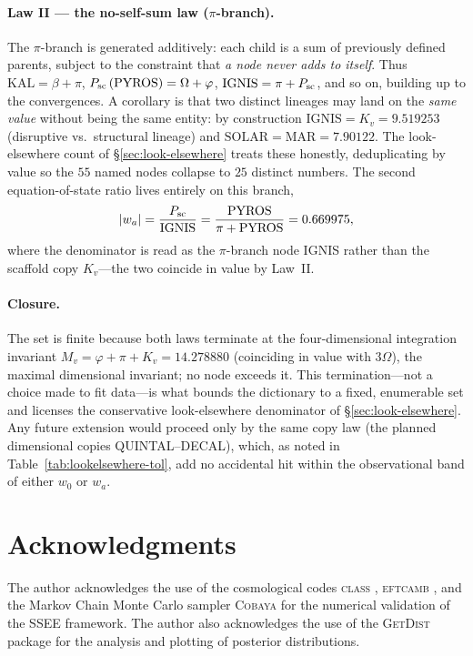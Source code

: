 \documentclass[a4paper,11pt]{article}
\begin{document}
\paragraph{Law II --- the no-self-sum law ($\pi$-branch).} The $\pi$-branch is
generated additively: each child is a sum of previously defined parents, subject
to the constraint that \emph{a node never adds to itself}. Thus
$\mathrm{KAL}=\beta+\pi$, $P_{\rm sc}\,(\mathrm{PYROS})=\Omega+\varphi$,
$\mathrm{IGNIS}=\pi+P_{\rm sc}$, and so on, building up to the convergences. A
corollary is that two distinct lineages may land on the \emph{same value}
without being the same entity: by construction
$\mathrm{IGNIS}=K_v=9.519253$ (disruptive vs.\ structural lineage) and
$\mathrm{SOLAR}=\mathrm{MAR}=7.90122$. The look-elsewhere count of
\S\ref{sec:look-elsewhere} treats these honestly, deduplicating by value so the
$55$ named nodes collapse to $25$ distinct numbers. The second
equation-of-state ratio lives entirely on this branch,
\begin{equation}
  |w_a|=\frac{P_{\rm sc}}{\mathrm{IGNIS}}=\frac{\mathrm{PYROS}}{\pi+\mathrm{PYROS}}=0.669975 ,
\end{equation}
where the denominator is read as the $\pi$-branch node IGNIS rather than the
scaffold copy $K_v$---the two coincide in value by Law~II.

\paragraph{Closure.} The set is finite because both laws terminate at the
four-dimensional integration invariant $M_v=\varphi+\pi+K_v=14.278880$ (coinciding in value with $3\Omega$), the
maximal dimensional invariant; no node exceeds it. This termination---not a
choice made to fit data---is what bounds the dictionary to a fixed, enumerable
set and licenses the conservative look-elsewhere denominator of
\S\ref{sec:look-elsewhere}. Any future extension would proceed only by the same
copy law (the planned dimensional copies QUINTAL--DECAL), which, as noted in
Table~\ref{tab:lookelsewhere-tol}, add no accidental hit within the
observational band of either $w_0$ or $w_a$.

\section*{Acknowledgments}
The author acknowledges the use of the cosmological codes \textsc{class} \citep{Blas2011}, \textsc{eftcamb} \citep{Hu2014}, and the Markov Chain Monte Carlo sampler \textsc{Cobaya} \citep{Torrado2021} for the numerical validation of the SSEE framework. The author also acknowledges the use of the \textsc{GetDist} package \citep{Lewis2019} for the analysis and plotting of posterior distributions.
\end{document}
